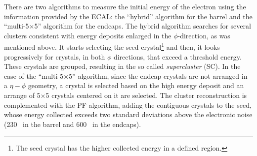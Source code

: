 \noindent There are two algorithms to measure the initial energy of the 
electron using the information provided by the ECAL: the ``hybrid'' algorithm for 
the barrel and the ``multi-5$\times$5'' algorithm for the endcaps. The hybrid algorithm
searches for several clusters consistent with energy deposits enlarged in the $\phi$-direction, as 
was mentioned above. It starts selecting the seed crystal\footnote{The seed crystal has 
the higher collected energy in a defined region.} and then, it looks 
progressively for crystals, in both $\phi$ directions, that exceed a threshold 
energy. These crystals are grouped, resulting in the so called \textit{supercluster} (SC). In the 
case of the ``multi-5$\times$5'' algorithm, since the endcap crystals are not arranged in 
a $\eta-\phi$ geometry, a crystal is selected based on the high energy deposit and an 
arrange of 5$\times$5 crystals centered on it are selected. The cluster reconstruction is complemented 
with the PF algorithm, adding the contiguous crystals to the seed, whose 
energy collected exceeds two standard deviations above the electronic noise
(230 \MeV~in the barrel and 600 \MeV~in the endcaps). \\




